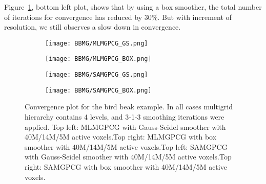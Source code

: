 Figure~\ref{fig:Bird_Beak_Convergence_Test}, bottom left plot, shows that by using a box smoother, the total number of iterations for convergence has reduced by 30\%. But with increment of resolution, we still observes a slow down in convergence.
 \begin{figure}[t]
 \begin{subfigure}[t]{0.5\textwidth}
 \centering
 \texttt{[image: BBMG/MLMGPCG\_GS.png]}
 \end{subfigure}
 \begin{subfigure}[t]{0.5\textwidth}
 \centering
 \texttt{[image: BBMG/MLMGPCG\_BOX.png]}
 \end{subfigure}	
  \begin{subfigure}[t]{0.5\textwidth}
 \centering
 \texttt{[image: BBMG/SAMGPCG\_GS.png]}
 \end{subfigure}
 \begin{subfigure}[t]{0.5\textwidth}
 \centering
 \texttt{[image: BBMG/SAMGPCG\_BOX.png]}
 \end{subfigure}	
\caption{Convergence plot for the bird beak example. In all cases multigrid hierarchy contains 4 levels, and 3-1-3 smoothing iterations were applied. Top left: MLMGPCG with Gauss-Seidel smoother with 40M/14M/5M active voxels.Top right: MLMGPCG with box smoother with 40M/14M/5M active voxels.Top left: SAMGPCG with Gauss-Seidel smoother with 40M/14M/5M active voxels.Top right: SAMGPCG with box smoother with 40M/14M/5M active voxels.}
\label{fig:Bird_Beak_Convergence_Test}
\end{figure}